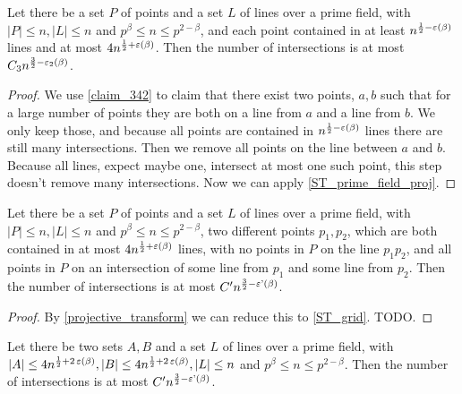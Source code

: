 \begin{theorem}
    \label{ST_prime_field_aux}
    \leanok
    Let there be a set $P$ of points and a set $L$ of lines over a prime field, 
    with $|P| \leq n, |L| \leq n$ and $p^\beta \leq n \leq p^{2 - \beta}$,
    and each point contained in at least $n^{\frac12 - \operatorname{\varepsilon}(\beta)}$ lines
    and at most $4 n^{\frac12 + \operatorname{\varepsilon}(\beta)}$.
    Then the number of intersections is at most $C_3 n^{\frac32 - \operatorname{\varepsilon_2}(\beta)}$.
\end{theorem}

\begin{proof}
    \leanok
    We use \ref{claim_342} to claim that there exist two points, $a, b$ such that for a large number of 
    points they are both on a line from $a$ and a line from $b$.
    We only keep those, and because all points are contained in $n^{\frac12 - \operatorname{\varepsilon}(\beta)}$ lines there are still many intersections.
    Then we remove all points on the line between $a$ and $b$. Because all lines, expect maybe one, intersect at most one such point,
    this step doesn't remove many intersections.
    Now we can apply \ref{ST_prime_field_proj}.
\end{proof}

\begin{theorem}
    \label{ST_prime_field_proj}
    \leanok
    Let there be a set $P$ of points and a set $L$ of lines over a prime field, 
    with $|P| \leq n, |L| \leq n$ and $p^\beta \leq n \leq p^{2 - \beta}$,
    two different points $p_1, p_2$, which are both contained in at most $4 n^{\frac12 + \operatorname{\varepsilon}(\beta)}$ lines,
    with no points in $P$ on the line $p_1 p_2$, and all points in $P$ on an intersection of some line from $p_1$ and some
    line from $p_2$.
    Then the number of intersections is at most $C' n^{\frac32 - \operatorname{\varepsilon'}(\beta)}$.
\end{theorem}

\begin{proof}
    \leanok
    By \ref{projective_transform} we can reduce this to \ref{ST_grid}.
    TODO.
\end{proof}

\begin{theorem}
    \label{ST_grid}
    \leanok
    Let there be two sets $A, B$ and a set $L$ of lines over a prime field, 
    with $|A| \leq 4n^{\frac12 + 2\operatorname{\varepsilon}(\beta)}, |B| \leq 4n^{\frac12 + 2\operatorname{\varepsilon}(\beta)}, |L| \leq n$ and $p^\beta \leq n \leq p^{2 - \beta}$.
    Then the number of intersections is at most $C' n^{\frac32 - \operatorname{\varepsilon'}(\beta)}$.
\end{theorem}

